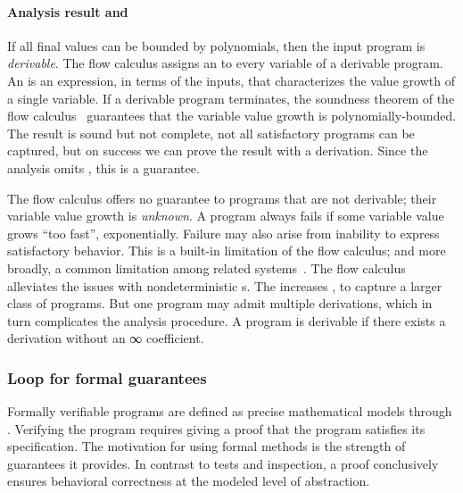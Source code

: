 \paragraph*{Analysis result and }
If all final values can be bounded by polynomials, then the input program is
\emph{derivable}. The flow calculus assigns an
\emph{} to every variable of a derivable program. An
 is an expression, in terms of the inputs, that characterizes the
value growth of a single variable. If a derivable program terminates, the
soundness theorem of the flow calculus~\cite[p. 11]{jones2009} guarantees that the variable value growth
is polynomially-bounded. The result is sound but not complete, \ie not all
satisfactory programs can be captured, but on success we can prove the result
with a derivation. Since the analysis omits , this is a
 guarantee.

The flow calculus offers no guarantee to programs that are
not derivable; their variable value growth is
\emph{unknown}. A program always fails if some variable value grows \enquote{too
fast}, \eg exponentially. Failure may also arise from inability to express
satisfactory behavior. This is a built-in limitation of the flow
calculus; and more broadly, a common limitation among
related systems~\cite[p. 2]{baillot2015}. The flow calculus alleviates the
issues with nondeterministic s. The
 increases , to capture a larger class
of programs. But one program may admit multiple derivations, which in turn
complicates the analysis procedure. A program is derivable
if there exists a derivation without an ∞ coefficient.

\subsubsection{Loop  for formal guarantees}
\label{subsec:specs}

Formally verifiable programs are defined as precise
mathematical models through . Verifying the program requires
giving a proof that the program satisfies its specification. The motivation for
using formal methods is the strength of guarantees it provides. In contrast to
tests and inspection, a proof conclusively ensures behavioral correctness at the
modeled level of abstraction.

